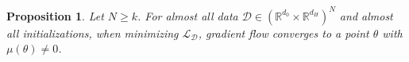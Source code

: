 \documentclass[twoside]{article}
\newtheorem{proposition}[theorem]{Proposition}
\theoremstyle{definition}
\theoremstyle{remark}
\begin{document}
\begin{proposition}
    \label{prop:exlude0}
    Let $N \geq k $. For almost all data $\mathcal{D} \in (\mathbb{R}^{d_0} \times \mathbb{R}^{d_H})^N$ and almost all initializations, when minimizing  $\mathcal{L}_\mathcal{D}$, gradient flow  converges to a point $\theta$ with $\mu(\theta)\neq 0$.
\end{proposition}


\end{document}
